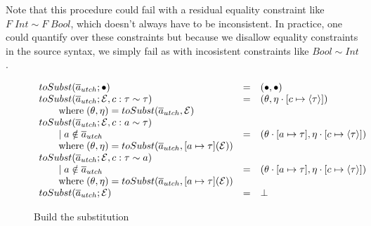 Note that this procedure could fail with a residual equality constraint like $F
\; Int \sim F \; Bool$, which doesn't always have to be inconsistent. In
practice, one could quantify over these constraints but because we disallow
equality constraints in the source syntax, we simply fail as with incosistent
constraints like $Bool \sim Int$.
\begin{figure}
\[
\begin{array}{l c l}
toSubst(\overline{a}_{utch}; \bullet) &=& (\bullet, \bullet)
\\
toSubst(\overline{a}_{utch}; \mathcal{E}, c : \tau \sim \tau) &=&
(\theta, \eta \cdot [c \mapsto \langle \tau \rangle] )
\\ \qquad \text{where} \; (\theta, \eta) = toSubst(\overline{a}_{utch}, \mathcal{E})
\\
toSubst(\overline{a}_{utch}; \mathcal{E}, c : a \sim \tau)
\\ \qquad \mid a \notin \overline{a}_{utch} &=& (\theta \cdot [a \mapsto \tau], \eta
\cdot [c \mapsto \langle \tau \rangle])
\\ \qquad \text{where} \; (\theta, \eta) = toSubst(\overline{a}_{utch}, [a \mapsto
\tau](\mathcal{E}))
\\
toSubst(\overline{a}_{utch}; \mathcal{E}, c : \tau \sim a)
\\ \qquad \mid a \notin \overline{a}_{utch} &=& (\theta \cdot [a \mapsto \tau], \eta
\cdot [c \mapsto \langle \tau \rangle])
\\ \qquad \text{where} \; (\theta, \eta) = toSubst(\overline{a}_{utch}, [a \mapsto
\tau](\mathcal{E}))
\\
toSubst(\overline{a}_{utch}; \mathcal{E}) &=& \bot
\end{array}
\]
\caption{Build the substitution}
\label{fig:to-subst}
\end{figure}
